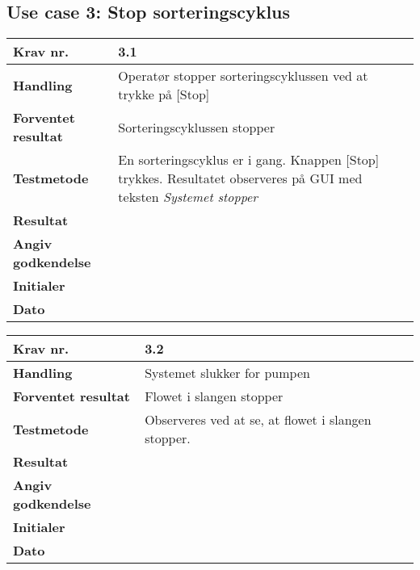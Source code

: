 \newpage
  \subsection{Use case 3: Stop sorteringscyklus}

	\begin{center}
		\begin{longtable}{ | m{4cm}| m{8.5cm}|} 
			\hline
			\textbf{Krav nr.} & 3.1  \\ 
			\hline
			\textbf{Handling} & Operatør stopper sorteringscyklussen ved at trykke på [Stop] \\
			\hline
			\textbf{Forventet resultat} & Sorteringscyklussen stopper \\
			\hline
			\textbf{Testmetode}  &En sorteringscyklus er i gang. Knappen [Stop] trykkes. Resultatet observeres på GUI med teksten \textit{Systemet stopper} \\
			\hline
			\textbf{Resultat}  &    \\
			\hline
			\textbf{Angiv godkendelse} &     \\
			\hline
			\textbf{Initialer} &     \\
			\hline
			\textbf{Dato} &    \\
			\hline
		\end{longtable}
	\end{center}
			
	\begin{center}
		\begin{longtable}{ | m{4cm}| m{8.5cm}|} 
			\hline
			\textbf{Krav nr.} & 3.2  \\ 
			\hline
			\textbf{Handling} & Systemet slukker for pumpen \\
			\hline
			\textbf{Forventet resultat} & Flowet i slangen stopper \\
			\hline
			\textbf{Testmetode}  & Observeres ved at se, at flowet i slangen stopper.  \\
			\hline
			\textbf{Resultat}  &    \\
			\hline
			\textbf{Angiv godkendelse} &     \\
			\hline
			\textbf{Initialer} &     \\
			\hline
			\textbf{Dato} &    \\
			\hline
		\end{longtable}
	\end{center}
			
